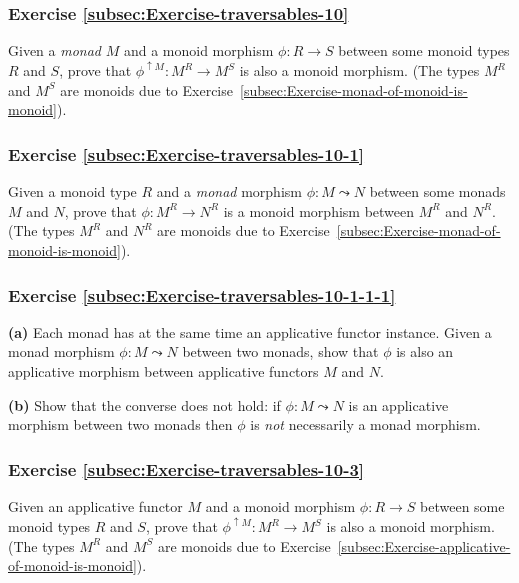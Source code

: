 \subsubsection{Exercise \label{subsec:Exercise-traversables-10}\ref{subsec:Exercise-traversables-10}}

Given a \emph{monad} $M$ and a monoid morphism $\phi:R\rightarrow S$
between some monoid types $R$ and $S$, prove that $\phi^{\uparrow M}:M^{R}\rightarrow M^{S}$
is also a monoid morphism. (The types $M^{R}$ and $M^{S}$ are monoids
due to Exercise~\ref{subsec:Exercise-monad-of-monoid-is-monoid}).

\subsubsection{Exercise \label{subsec:Exercise-traversables-10-1}\ref{subsec:Exercise-traversables-10-1}}

Given a monoid type $R$ and a \emph{monad} morphism $\phi:M\leadsto N$
between some monads $M$ and $N$, prove that $\phi:M^{R}\rightarrow N^{R}$
is a monoid morphism between $M^{R}$ and $N^{R}$. (The types $M^{R}$
and $N^{R}$ are monoids due to Exercise~\ref{subsec:Exercise-monad-of-monoid-is-monoid}).

\subsubsection{Exercise \label{subsec:Exercise-traversables-10-1-1-1}\ref{subsec:Exercise-traversables-10-1-1-1}}

\textbf{(a)} Each monad has at the same time an applicative functor
instance. Given a monad morphism $\phi:M\leadsto N$ between two monads,
show that $\phi$ is also an applicative morphism between applicative
functors $M$ and $N$.

\textbf{(b)} Show that the converse does not hold: if $\phi:M\leadsto N$
is an applicative morphism between two monads then $\phi$ is \emph{not}
necessarily a monad morphism.

\subsubsection{Exercise \label{subsec:Exercise-traversables-10-3}\ref{subsec:Exercise-traversables-10-3}}

Given an applicative functor $M$ and a monoid morphism $\phi:R\rightarrow S$
between some monoid types $R$ and $S$, prove that $\phi^{\uparrow M}:M^{R}\rightarrow M^{S}$
is also a monoid morphism. (The types $M^{R}$ and $M^{S}$ are monoids
due to Exercise~\ref{subsec:Exercise-applicative-of-monoid-is-monoid}).

